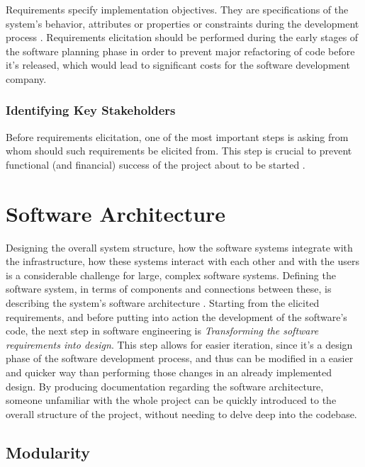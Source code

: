 Requirements specify implementation objectives. They are specifications of the system's behavior, attributes or properties or constraints during the development process \Parencite{sommerville_sawyer_1997}. Requirements elicitation should be performed during the early stages of the software planning phase in order to prevent major refactoring of code before it's released, which would lead to significant costs for the software development company.

\subsubsection{Identifying Key Stakeholders}\label{state-of-the-art:sss:identifying-key-stakeholders}

Before requirements elicitation, one of the most important steps is asking from whom should such requirements be elicited from. This step is crucial to prevent functional (and financial) success of the project about to be started \parencite{lewellen_2020}.


\section{Software Architecture}\label{state-of-the-art:s:software-architecture}

Designing the overall system structure, how the software systems integrate with the infrastructure, how these systems interact with each other and with the users is a considerable challenge for large, complex software systems. Defining the software system, in terms of components and connections between these, is describing the system's software architecture \Parencite{hasselbring2018software}. Starting from the elicited requirements, and before putting into action the development of the software's code, the next step in software engineering is \textit{Transforming the software requirements into design}. This step allows for easier iteration, since it's a design phase of the software development process, and thus can be modified in a easier and quicker way than performing those changes in an already implemented design.
By producing documentation regarding the software architecture, someone unfamiliar with the whole project can be quickly introduced to the overall structure of the project, without needing to delve deep into the codebase.

\subsection{Modularity}\label{state-of-the-art:ss:modularity}

